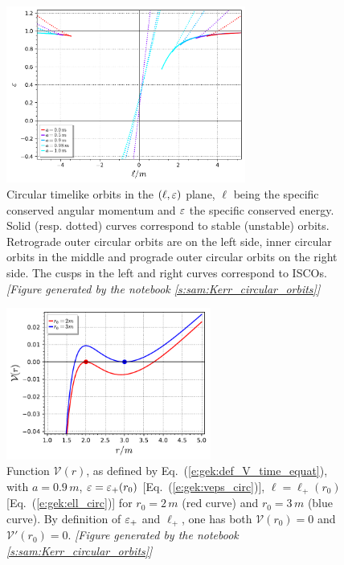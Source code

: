 \begin{figure}
\centerline{\includegraphics[width=0.7\textwidth]{gek_ell_eps_circ_orb.pdf}}
\caption[]{\label{f:gek:ell_eps_circ_orb} \footnotesize
Circular timelike orbits in the $(\ell,\varepsilon)$ plane, $\ell$ being the
specific conserved angular momentum and $\varepsilon$ the specific conserved
energy. Solid (resp. dotted) curves correspond to stable (unstable) orbits.
Retrograde outer circular orbits are on the left side, inner circular orbits
in the middle and prograde outer circular orbits on the right side.
The cusps in the left and right curves correspond to ISCOs.
\textsl{[Figure generated by the notebook \ref{s:sam:Kerr_circular_orbits}]}
}
\end{figure}



\begin{figure}
\centerline{\includegraphics[width=0.6\textwidth]{gek_V_stability.pdf}}
\caption[]{\label{f:gek:V_stability} \footnotesize
Function $\mathcal{V}(r)$, as defined by Eq.~(\ref{e:gek:def_V_time_equat}),
with $a=0.9\, m$, $\varepsilon = \varepsilon_+(r_0)$ [Eq.~(\ref{e:gek:veps_circ})],
$\ell = \ell_+(r_0)$ [Eq.~(\ref{e:gek:ell_circ})] for $r_0 = 2\, m$
(red curve) and $r_0 = 3 \, m$ (blue curve). By definition of $\varepsilon_+$ and $\ell_+$,
one has both $\mathcal{V}(r_0) = 0$ and $\mathcal{V}'(r_0) = 0$.
\textsl{[Figure generated by the notebook \ref{s:sam:Kerr_circular_orbits}]}
}
\end{figure}



